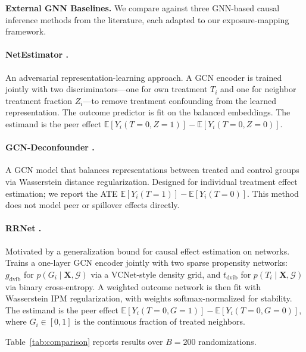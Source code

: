 \documentclass{article}
\theoremstyle{plain}
\theoremstyle{definition}
\theoremstyle{remark}
\begin{document}
\textbf{External GNN Baselines. } We compare against three GNN-based causal inference methods from the literature,
each adapted to our exposure-mapping framework.

\paragraph{NetEstimator \citep{jiang2022estimating}.}
An adversarial representation-learning approach. A GCN encoder is trained
jointly with two discriminators---one for own treatment $T_i$ and one for
neighbor treatment fraction $Z_i$---to remove treatment confounding from
the learned representation. The outcome predictor is fit on the balanced
embeddings. The estimand is the peer effect
$\mathbb{E}[Y_i(T{=}0, Z{=}1)] - \mathbb{E}[Y_i(T{=}0, Z{=}0)]$.

\paragraph{GCN-Deconfounder \citep{guo2020learning}.}
A GCN model that balances representations between treated and control groups
via Wasserstein distance regularization. Designed for individual treatment
effect estimation; we report the ATE
$\mathbb{E}[Y_i(T{=}1)] - \mathbb{E}[Y_i(T{=}0)]$.
This method does not model peer or spillover effects directly.

\paragraph{RRNet \citep{cai2023generalization}.}
Motivated by a generalization bound for causal effect estimation on networks.
Trains a one-layer GCN encoder jointly with two sparse propensity networks:
$g_{\mathrm{dvib}}$ for $p(G_i \mid \mathbf{X}, \mathcal{G})$ via a
VCNet-style density grid, and $t_{\mathrm{dvib}}$ for
$p(T_i \mid \mathbf{X}, \mathcal{G})$ via binary cross-entropy.
A weighted outcome network is then fit with Wasserstein IPM regularization,
with weights softmax-normalized for stability. The estimand is the peer effect
$\mathbb{E}[Y_i(T{=}0, G{=}1)] - \mathbb{E}[Y_i(T{=}0, G{=}0)]$,
where $G_i \in [0,1]$ is the continuous fraction of treated neighbors.



Table~\ref{tab:comparison} reports results over $B = 200$ randomizations.
 
\end{document}
